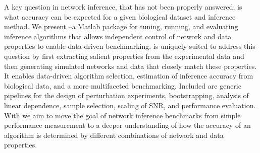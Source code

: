 A key question in network inference, that has not been properly answered, is what accuracy can be expected for a given biological dataset and inference method. We present \gs--a Matlab package for tuning, running, and evaluating inference algorithms that allows independent control of network and data properties to enable data-driven benchmarking. \gs is uniquely suited to address this question by first extracting salient properties from the experimental data and then generating simulated networks and data that closely match these properties.%
It enables data-driven algorithm selection,  estimation of inference accuracy from biological data, and a more multifaceted benchmarking. 
Included are generic pipelines for the design of perturbation experiments, bootstrapping, analysis of linear dependence, sample selection, scaling of SNR, and performance evaluation.
With \gs we aim to move the goal of network inference benchmarks from simple performance measurement to a deeper understanding of how the accuracy of an algorithm is determined by different combinations of network and data properties.

